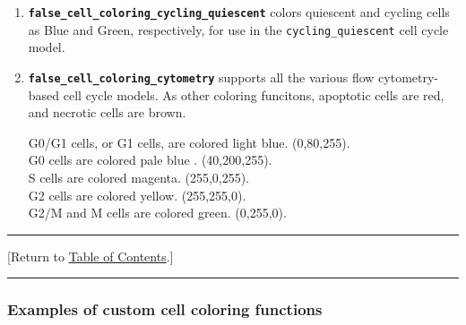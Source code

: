 \documentclass[12pt]{article}
\newcommand{\beq}{\begin{equation}}
\newcommand{\eeq}{\end{equation}}
\newcommand{\smallcode}[1]{\textbf{\texttt{#1}}}
\newcommand{\red}[1]{\textcolor{red}{#1}}
\newcommand{\TOClink}{\begin{center}\hrule\vskip-10pt\phantom{.}\hfill[Return to \hyperlink{TOC}{Table of Contents}.]\hfill\phantom{.}\vskip3pt\hrule\end{center}}
\begin{document}
\begin{enumerate}
The nucleus is colored by virtual hematoxylin staining, with incoming 
light color white (255,255,255), hematoxylin absorb color 
(49.90,51.00,20.40) \cite{ref:H_and_E}, 
and a stain intensity given by 
%
\beq
\texttt{stain} = 
 \frac{ \texttt{pCell->phenotype.volume.nuclear\_solid} }
 { \texttt{pCell->phenotype.volume.nuclear} + 10^{-10} }, 
\eeq
%
which approximates the process of staining nuclear solids with hematoxylin, and 
the water fraction remaining unstained.

All outlines match the corresponding fill colors. 



\item
\smallcode{false\_cell\_coloring\_cycling\_quiescent} colors quiescent and cycling cells as Blue and Green, 
respectively, for use in the \texttt{cycling\_quiescent} cell cycle model. 

\item
\smallcode{false\_cell\_coloring\_cytometry} supports all the various flow cytometry-based cell 
cycle models.  As other coloring funcitons, apoptotic cells are red, and necrotic cells are brown. 

G0/G1 cells, or G1 cells, are colored light blue. (0,80,255). \\
G0 cells are colored pale blue . (40,200,255). \\
S cells are colored magenta. (255,0,255). \\
G2 cells are colored yellow. (255,255,0). \\
G2/M and M cells are colored green. (0,255,0). 


\end{enumerate}

\TOClink 

\subsubsection{Examples of custom cell coloring functions}
\end{document}
